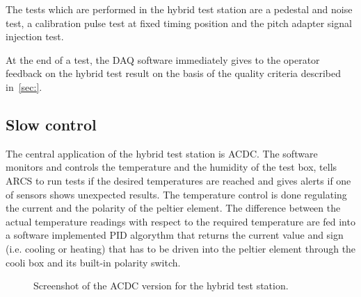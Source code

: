 The tests which are performed in the hybrid test station are a pedestal and noise test, a calibration pulse test at fixed timing position and the pitch adapter signal injection test.

At the end of a test, the DAQ software immediately gives to the operator feedback on the hybrid test result on the basis of the quality criteria described in~\ref{sec:}.

\subsection{Slow control}

The central application of the hybrid test station is ACDC. The software monitors and controls the temperature and the humidity of the test box, tells ARCS to run tests if the desired temperatures are reached and gives alerts if one of sensors shows unexpected results. The temperature control is done regulating the current and the polarity of the peltier element. The difference between the actual temperature readings with respect to the required temperature are fed into a software implemented PID algorythm that returns the current value and sign (i.e. cooling or heating) that has to be driven into the peltier element through the cooli box and its built-in polarity switch.
\begin{figure}[h]
  \begin{center}
    \caption{Screenshot of the ACDC version for the hybrid test station.}
    \label{fig:ss_acdc_teststation}
  \end{center}
\end{figure}

